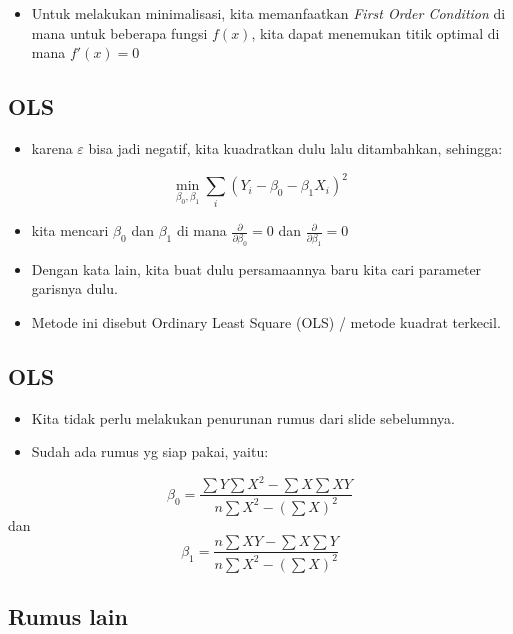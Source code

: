 \documentclass[
  letterpaper,
  DIV=11,
  numbers=noendperiod]{scrartcl}
\providecommand{\tightlist}{%
  \setlength{\itemsep}{0pt}\setlength{\parskip}{0pt}}\usepackage{longtable,booktabs,array}
\begin{document}
\begin{itemize}
\tightlist
\item
  Untuk melakukan minimalisasi, kita memanfaatkan \emph{First Order
  Condition} di mana untuk beberapa fungsi \(f(x)\), kita dapat
  menemukan titik optimal di mana \(f'(x)=0\)
\end{itemize}

\subsection{OLS}\label{ols-1}

\begin{itemize}
\tightlist
\item
  karena \(\varepsilon\) bisa jadi negatif, kita kuadratkan dulu lalu
  ditambahkan, sehingga:
\end{itemize}

\[
\min_{\beta_0,\beta_1} \sum_i \left(Y_i-\beta_0-\beta_1 X_i \right)^2
\]

\begin{itemize}
\item
  kita mencari \(\beta_0\) dan \(\beta_1\) di mana
  \(\frac{\partial}{\partial \beta_0}=0\) dan
  \(\frac{\partial}{\partial \beta_1}=0\)
\item
  Dengan kata lain, kita buat dulu persamaannya baru kita cari parameter
  garisnya dulu.
\item
  Metode ini disebut Ordinary Least Square (OLS) / metode kuadrat
  terkecil.
\end{itemize}

\subsection{OLS}\label{ols-2}

\begin{itemize}
\item
  Kita tidak perlu melakukan penurunan rumus dari slide sebelumnya.
\item
  Sudah ada rumus yg siap pakai, yaitu:
\end{itemize}

\[
\beta_0=\frac{\sum Y \sum X^2-\sum X \sum XY}{n\sum X^2-(\sum X)^2}
\] dan \[
\beta_1=\frac{n\sum XY - \sum X \sum Y}{n \sum X^2-(\sum X)^2}
\]

\subsection{Rumus lain}\label{rumus-lain}
\end{document}
